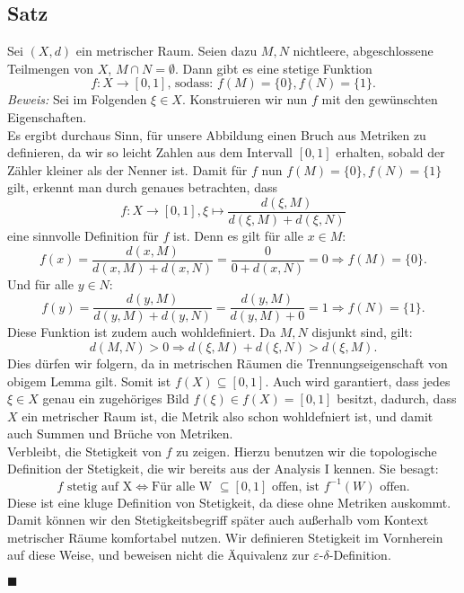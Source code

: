 \documentclass[11pt,leqno]{article}
\begin{document}
\subsection{Satz}
Sei $(X,d)$ ein metrischer Raum.
Seien dazu $M, N$ nichtleere, abgeschlossene Teilmengen von $X$, $M \cap N = \emptyset $. Dann gibt es eine stetige Funktion
\[f: X \rightarrow{} [0,1] \text{, sodass: } f(M)=\{0\}, f(N)=\{1\}.\]
\textit{Beweis:}
Sei im Folgenden $\xi \in X$. Konstruieren wir nun $f$ mit den gewünschten Eigenschaften.\\
Es ergibt durchaus Sinn, für unsere Abbildung einen Bruch aus Metriken zu definieren, da wir so leicht Zahlen aus dem Intervall $[0,1]$ erhalten,
sobald der Zähler kleiner als der Nenner ist. Damit für $f$ nun $f(M)=\{0\}, f(N)=\{1\}$ gilt, erkennt man durch genaues betrachten, dass
\[f: X \xrightarrow{} [0,1], \xi \mapsto \frac{d(\xi,M)}{d(\xi,M)+d(\xi,N)} \]
eine sinnvolle Definition für $f$ ist.
Denn es gilt für alle $x \in M$:
\[ f(x)= \frac{d(x,M)}{d(x,M)+d(x,N)}=\frac{0}{0+d(x,N)}=0 \Rightarrow f(M)=\{0\}.\]
Und für alle $y \in N$: 
\[ f(y)= \frac{d(y,M)}{d(y,M)+d(y,N)}=\frac{d(y,M)}{d(y,M)+0}= 1 \Rightarrow f(N)=\{1\}.\]
Diese Funktion ist zudem auch wohldefiniert. Da $M,N$ disjunkt sind, gilt: 
\[d(M,N) > 0 \Rightarrow d(\xi,M) + d(\xi,N) > d(\xi,M).\]
Dies dürfen wir folgern, da in metrischen Räumen die Trennungseigenschaft von obigem Lemma gilt.
Somit ist $f(X) \subseteq [0,1]$.
Auch wird garantiert, dass jedes $\xi \in X$ genau ein zugehöriges Bild $f(\xi) \in f(X)=[0,1]$ besitzt, dadurch, dass $X$ ein 
metrischer Raum ist, die Metrik also schon wohldefniert ist, und damit auch Summen und Brüche von Metriken.\\
Verbleibt, die Stetigkeit von $f$ zu zeigen. Hierzu benutzen wir die topologische Definition der Stetigkeit, die wir bereits aus der Analysis I
kennen. Sie besagt:
\[f \text{ stetig auf X} \Leftrightarrow \text{Für alle W } \subseteq [0,1] \text{ offen, ist } f^{-1}(W) \text{ offen.}\]
Diese ist eine kluge Definition von Stetigkeit, da diese ohne Metriken auskommt. Damit können wir den Stetigkeitsbegriff später auch außerhalb vom 
Kontext metrischer Räume komfortabel nutzen. Wir definieren Stetigkeit im Vornherein auf diese Weise, und beweisen nicht die Äquivalenz zur 
$\varepsilon$-$\delta$-Definition.\\


\begin{flushright} $\blacksquare$ \end{flushright}
\end{document}
